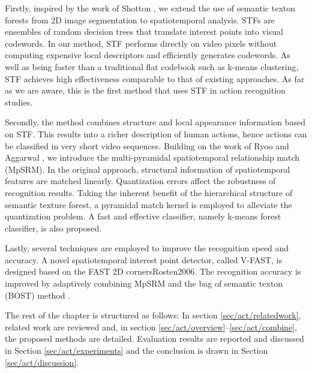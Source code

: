 Firstly, inspired by the work of Shotton , we extend the use of semantic texton forests from 2D image segmentation to spatiotemporal analysis. STFs are ensembles of random decision trees that translate interest points into visual codewords. In our method, STF performs directly on video pixels without computing expensive local descriptors and efficiently generates codewords. As well as being faster than a traditional flat codebook such as k-means clustering, STF achieves high effectiveness comparable to that of existing approaches.
As far as we are aware, this is the first method that uses STF in action recognition studies.

Secondly, the method combines structure and local appearance information based on STF. This results into a richer description of human actions, hence actions can be classified in very short video sequences. Building on the work of Ryoo and Aggarwal \cite{Ryoo2009}, we introduce the multi-pyramidal spatiotemporal relationship match (MpSRM). In the original approach, structural information of spatiotemporal features are matched linearly. Quantization errors affect the robustness of recognition results. Taking the inherent benefit of the hierarchical structure of semantic texture forest, a pyramidal match kernel \cite{Grauman2005} is employed to alleviate the quantization problem.
A fast and effective classifier, namely k-means forest classifier, is also proposed.

Lastly, several techniques are employed to improve the recognition speed and accuracy. A novel spatiotemporal interest point detector, called V-FAST, is designed based on the FAST 2D corners{Rosten2006}. The recognition accuracy is improved by adaptively combining MpSRM and the bag of semantic texton (BOST) method \cite{Shotton2008}.

The rest of the chapter is structured as follows: In section \ref{sec/act/relatedwork}, related work are reviewed and, in section \ref{sec/act/overview}--\ref{sec/act/combine}, the proposed methods are detailed. Evaluation results are reported and discussed in Section \ref{sec/act/experiments} and the conclusion is drawn in Section \ref{sec/act/discussion}.


